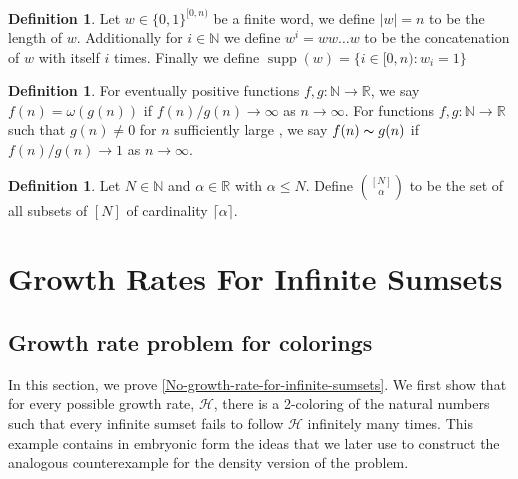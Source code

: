 \documentclass[letter, 11pt]{article}
\theoremstyle{plain} %
\theoremstyle{definition} %
\newtheorem{definition}[theorem]{Definition}
\theoremstyle{plain}
\theoremstyle{plain}
\newcommand{\N}{\mathbb{N}}
\newcommand{\R}{\mathbb{R}}
\DeclareMathOperator\supp{supp}
\newcommand{\1}{\mathbbm{1}}
\begin{document}
\begin{definition}
Let $w \in \{0,1\}^{[0,n)}$ be a finite word, we define $|w| = n$ to be the length of $w$. Additionally for $i \in \N$ we define $w^i = ww\ldots w$ to be the concatenation of $w$ with itself $i$ times. Finally we define $\supp (w) = \{ i \in [0,n): w_i = 1 \}$
\end{definition}

\begin{definition}
    For eventually positive functions $f,g:\N\to \R$, we say $f(n)=\omega(g(n))$ if $f(n)/g(n)\to \infty$ as $n\to\infty$. For functions $f,g:\N\to \R$ such that $g(n)\neq 0$ for $n$ sufficiently large , we say $f(n)\thicksim g(n)$ if $f(n)/g(n)\to 1$ as $n\to \infty$. 
\end{definition} 

\begin{definition} Let $N \in \N$ and $\alpha \in \R$ with $\alpha \leq N$. Define $\binom{[N]}{\alpha}$ to be the set of all subsets of $[N]$ of cardinality $\lceil \alpha \rceil$.
\end{definition}

\section{Growth Rates For Infinite Sumsets}
\subsection{Growth rate problem for colorings}
In this section, we prove \cref{No-growth-rate-for-infinite-sumsets}. We first show that for every possible growth rate, $\mathcal{H}$, there is a 2-coloring of the natural numbers such that every infinite sumset fails to follow $\mathcal{H}$ infinitely many times. This example contains in embryonic form the ideas that we later use to construct the analogous counterexample for the density version of the problem. 
\end{document}
